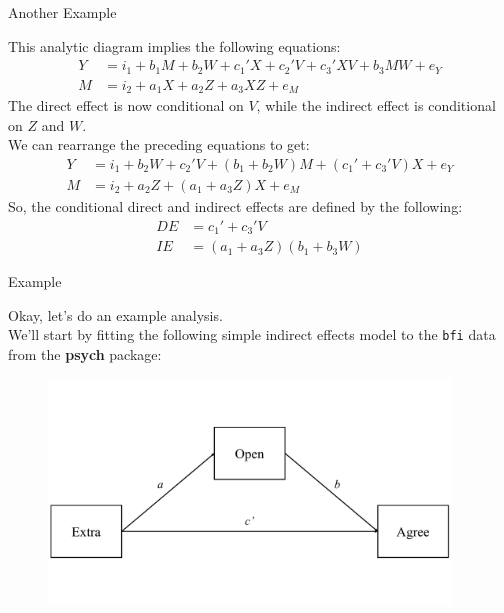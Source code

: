 \documentclass{beamer}
\newcommand{\va}[0]{\vspace{12pt}}
\newcommand{\vb}[0]{\vspace{6pt}}
\begin{document}
\begin{frame}{Another Example}
  
  This analytic diagram implies the following equations:
  \begin{align*}
    Y &= i_1 + b_1M + b_2W + c_1'X + c_2'V + c_3'XV + b_3MW + e_Y\\
    M &= i_2 + a_1X + a_2Z + a_3XZ + e_M 
  \end{align*}
  \pause 
  The direct effect is now conditional on $V$, while the
  indirect effect is conditional on $Z$ and $W$.\\ 
  \va 
  \pause 
  We can rearrange the preceding equations to get:
  \begin{align*}
    Y &= i_1 + b_2W + c_2'V + \left( b_1 + b_2W \right)M + \left( c_1' + c_3'V \right)X + e_Y\\
    M &= i_2 + a_2Z + \left( a_1 + a_3Z \right)X + e_M
  \end{align*}
  So, the conditional direct and indirect effects are defined by the
  following:
  \begin{align*}
    DE &= c_1' + c_3'V\\
    IE &= \left(a_1 + a_3Z \right) \left(b_1 + b_3W \right)
  \end{align*}
  
\end{frame}



\begin{frame}{Example}
  
  Okay, let's do an example analysis.\\ 
  \va 
  We'll start by fitting the following simple indirect effects 
  model to the \texttt{bfi} data from the \textbf{psych} package: 
  \vb
  \begin{figure}
    \includegraphics[width=0.95\textwidth]{figures/example1.pdf}
  \end{figure}
  
\end{frame}
\end{document}
